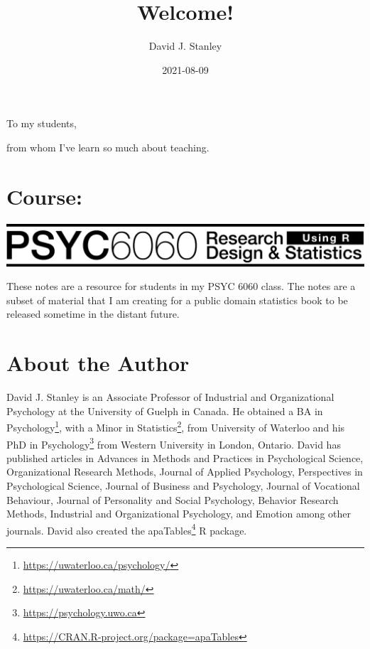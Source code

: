 \documentclass[
]{krantz}
\title{Welcome!}
\author{David J. Stanley}
\date{2021-08-09}
\renewcommand{\href}[2]{#2\footnote{\url{#1}}}
\begin{document}
\maketitle


\thispagestyle{empty}

\begin{center}
To my students,

from whom I've learn so much about teaching.
\end{center}

\setlength{\abovedisplayskip}{-5pt}
\setlength{\abovedisplayshortskip}{-5pt}

{
\hypersetup{linkcolor=}
\setcounter{tocdepth}{2}
\tableofcontents
}
\listoftables
\listoffigures
\hypertarget{course}{%
\chapter*{Course:}\label{course}}


\includegraphics[width=1\linewidth]{header_6060}

These notes are a resource for students in my PSYC 6060 class. The notes are a subset of material that I am creating for a public domain statistics book to be released sometime in the distant future.

\hypertarget{about-the-author}{%
\chapter*{About the Author}\label{about-the-author}}


David J. Stanley is an Associate Professor of Industrial and Organizational Psychology at the University of Guelph in Canada. He obtained a BA in \href{https://uwaterloo.ca/psychology/}{Psychology}, with a Minor in \href{https://uwaterloo.ca/math/}{Statistics}, from University of Waterloo and his PhD in \href{https://psychology.uwo.ca}{Psychology} from Western University in London, Ontario. David has published articles in Advances in Methods and Practices in Psychological Science, Organizational Research Methods, Journal of Applied Psychology, Perspectives in Psychological Science, Journal of Business and Psychology, Journal of Vocational Behaviour, Journal of Personality and Social Psychology, Behavior Research Methods, Industrial and Organizational Psychology, and Emotion among other journals. David also created the \href{https://CRAN.R-project.org/package=apaTables}{apaTables} R package.
\end{document}
